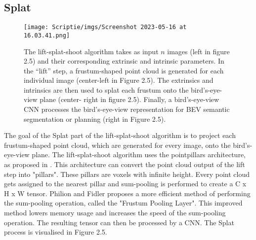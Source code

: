 \documentclass{uva-inf-bachelor-thesis}
\begin{document}
        \subsection{Splat}
            \begin{figure}[H]
            \centering
            \texttt{[image: Scriptie/imgs/Screenshot 2023-05-16 at 16.03.41.png]}
            \caption{The lift-splat-shoot algorithm takes as input $n$ images (left in figure 2.5) and their
                corresponding extrinsic and intrinsic parameters. In the “lift” step, a frustum-shaped
                point cloud is generated for each individual image (center-left in Figure 2.5). The extrinsics and
                intrinsics are then used to splat each frustum onto the bird’s-eye-view plane (center-
                right in figure 2.5). Finally, a bird’s-eye-view CNN processes the bird’s-eye-view representation for
                BEV semantic segmentation or planning (right in Figure 2.5). \cite{liftsplatshoot}}
            \end{figure}

            The goal of the Splat part of the lift-splat-shoot algorithm is to project each frustum-shaped point cloud, which are generated for every image, onto the bird's-eye-view plane. 
            The lift-splat-shoot algorithm uses the pointpillars architecture, as proposed in \cite{pointpillar}. This architecture can convert the point cloud output of the lift step into "pillars". These pillars are voxels with infinite height. Every point cloud gets assigned to the nearest pillar and sum-pooling is performed to create a C x H x W tensor. Philion and Fidler \cite{liftsplatshoot} proposes a more efficient method of performing the sum-pooling operation, called the "Frustum Pooling Layer". This improved method lowers memory usage and increases the speed of the sum-pooling operation. The resulting tensor can then be processed by a CNN. The Splat process is visualised in Figure 2.5.
\end{document}
